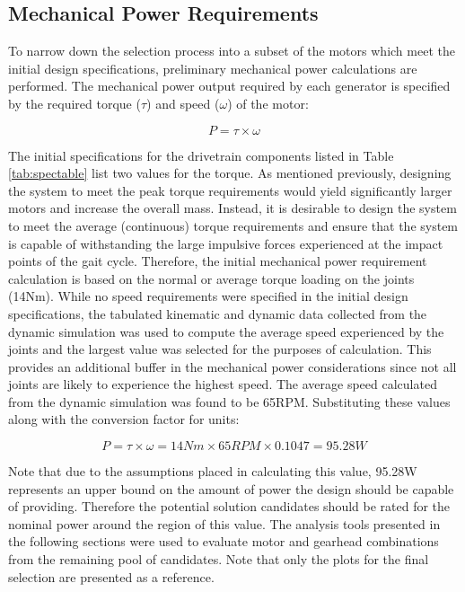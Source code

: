 \subsection{Mechanical Power Requirements} %
\label{sub:mechanical_power_requirements}
To narrow down the selection process into a subset of the motors which meet the initial design specifications, preliminary mechanical power calculations are performed. The mechanical power output required by each generator is specified by the required torque ($\tau$) and speed ($\omega$) of the motor: 

\begin{equation}
	P = \tau \times \omega
\end{equation}

The initial specifications for the drivetrain components listed in Table \ref{tab:spectable} list two values for the torque. As mentioned previously, designing the system to meet the peak torque requirements would yield significantly larger motors and increase the overall mass. Instead, it is desirable to design the system to meet the average (continuous) torque requirements and ensure that the system is capable of withstanding the large impulsive forces experienced at the impact points of the gait cycle. Therefore, the initial mechanical power requirement calculation is based on the normal or average torque loading on the joints (14Nm). While no speed requirements were specified in the initial design specifications, the tabulated kinematic and dynamic data collected from the dynamic simulation was used to compute the average speed experienced by the joints and the largest value was selected for the purposes of calculation. This provides an additional buffer in the mechanical power considerations since not all joints are likely to experience the highest speed. The average speed calculated from the dynamic simulation was found to be 65RPM. Substituting these values along with the conversion factor for units: 

\begin{equation}
	P = \tau \times \omega = 14Nm \times 65RPM \times 0.1047 = 95.28W
\end{equation}

Note that due to the assumptions placed in calculating this value, 95.28W represents an upper bound on the amount of power the design should be capable of providing. Therefore the potential solution candidates should be rated for the nominal power around the region of this value. The analysis tools presented in the following sections were used to evaluate motor and gearhead combinations from the remaining pool of candidates. Note that only the plots for the final selection are presented as a reference.

